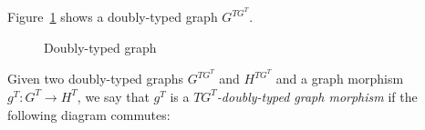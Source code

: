 \begin{example} Figure~\ref{fig:process:doubly-typed-graph} shows a doubly-typed graph $G^{TG^T}$.

\begin{figure}[!ht]
  \centering
  \caption{Doubly-typed graph}\label{fig:process:doubly-typed-graph}
\end{figure}

\end{example}

\begin{definition}
  Given two doubly-typed graphs $G^{TG^T}$ and $H^{TG^T}$ and a graph morphism $g^T : G^T \rightarrow H^T$, we say that $g^T$ is a \emph{$TG^T$-doubly-typed graph morphism} if the following diagram commutes:

\end{definition}

